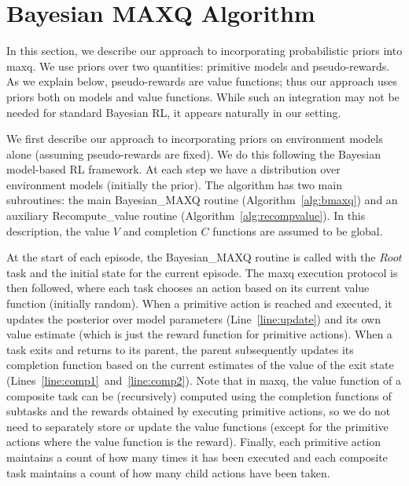 \section{Bayesian {\sc MAXQ} Algorithm}
\label{sec:algo}

In this section, we describe our approach to incorporating
probabilistic priors into {\sc maxq}. We use priors over two quantities:
primitive models and pseudo-rewards. As we explain below,
pseudo-rewards are value functions; thus our approach
uses priors both on models and value functions. While such an
integration may not be needed for standard Bayesian RL, it appears
naturally in our setting.

We first describe our approach to incorporating priors on environment
models alone (assuming pseudo-rewards are fixed). We do this following the Bayesian model-based RL framework. 
 At each step we have a distribution over
environment models (initially the prior). The algorithm has two
main subroutines: the main {\sc Bayesian\_MAXQ} routine
(Algorithm~\ref{alg:bmaxq}) and an auxiliary {\sc Recompute\_value}
routine (Algorithm~\ref{alg:recompvalue}). In this description, the value $V$ and
completion $C$ functions are assumed to be global.


At the start of each episode, the {\sc Bayesian\_MAXQ} routine is
called with the $Root$ task and the initial state for the current
episode. The {\sc maxq} execution protocol is then followed, where
each task chooses an action based on its current value function
(initially random). When a primitive action is reached and executed,
it updates the posterior over model parameters
(Line~\ref{line:update}) and its own value estimate (which is just the
reward function for primitive actions). When a task exits and returns
to its parent, the parent subsequently updates its completion function
based on the current estimates of the value of the exit state
(Lines~\ref{line:comp1}~and~\ref{line:comp2}). Note that in {\sc
  maxq}, the value function of a composite task can be (recursively)
computed using the completion functions of subtasks and the rewards
obtained by executing primitive actions, so we do not need to
separately store or update the value functions (except for the
primitive actions where the value function is the reward). Finally,
each primitive action maintains a count of how many times it has been
executed and each composite task maintains a count of how many child
actions have been taken.

